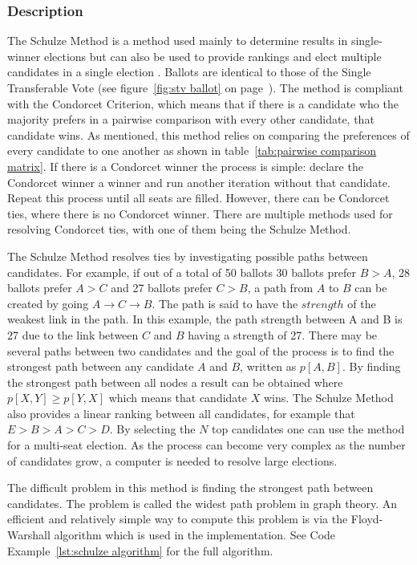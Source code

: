 \documentclass[12pt]{article}
\begin{document}
\subsubsection{Description}
The Schulze Method is a method used mainly to determine results in single-winner elections but can also be used to provide rankings and elect multiple candidates in a single election \autocite{Schulze2011}. Ballots are identical to those of the Single Transferable Vote (see figure~\ref{fig:stv ballot} on page~\pageref{fig:stv ballot}). The method is compliant with the Condorcet Criterion, which means that if there is a candidate who the majority prefers in a pairwise comparison with every other candidate, that candidate wins. As mentioned, this method relies on comparing the preferences of every candidate to one another as shown in table~\ref{tab:pairwise comparison matrix}. If there is a Condorcet winner the process is simple: declare the Condorcet winner a winner and run another iteration without that candidate. Repeat this process until all seats are filled. However, there can be Condorcet ties, where there is no Condorcet winner. There are multiple methods used for resolving Condorcet ties, with one of them being the Schulze Method.

The Schulze Method resolves ties by investigating possible paths between candidates. For example, if out of a total of 50 ballots 30 ballots prefer $B>A$, 28 ballots prefer $A>C$ and 27 ballots prefer $C>B$, a path from $A$ to $B$ can be created by going $A \rightarrow C \rightarrow B$. The path is said to have the $strength$ of the weakest link in the path. In this example, the path strength between A and B is 27 due to the link between $C$ and $B$ having a strength of 27. There may be several paths between two candidates and the goal of the process is to find the strongest path between any candidate $A$ and $B$, written as $p[A,B]$. By finding the strongest path between all nodes a result can be obtained where $p[X,Y] \geq p[Y,X]$ which means that candidate $X$ wins. The Schulze Method also provides a linear ranking between all candidates, for example that $E > B > A > C > D$. By selecting the $N$ top candidates one can use the method for a multi-seat election. As the process can become very complex as the number of candidates grow, a computer is needed to resolve large elections.

The difficult problem in this method is finding the strongest path between candidates. The problem is called the widest path problem in graph theory. An efficient and relatively simple way to compute this problem is via the Floyd-Warshall algorithm which is used in the implementation. See Code Example~\ref{lst:schulze algorithm} for the full algorithm.
\end{document}
